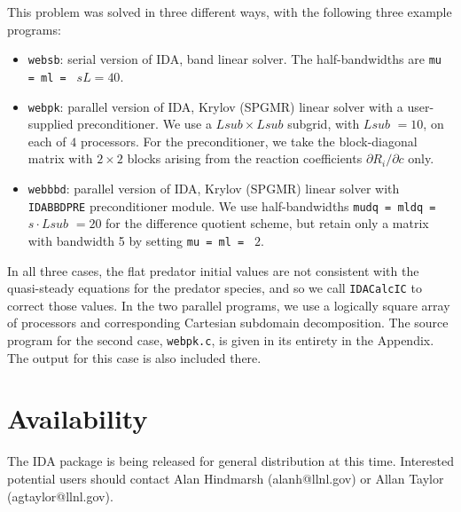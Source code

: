 This problem was solved in three different ways, with the following
three example programs:
\begin{itemize}

\item {\tt websb}: serial version of IDA, band linear solver.  The
half-bandwidths are 
\newline
{\tt mu = ml = } $sL = 40$.

\item {\tt webpk}: parallel version of IDA, Krylov (SPGMR) linear
solver with a user-supplied preconditioner. We use a $\mathit{Lsub} \times 
\mathit{Lsub}$ subgrid, with $\mathit{Lsub}$ $ = 10$, on each of $4$ processors. 
For the preconditioner, we take the block-diagonal matrix with $2 \times 2$ 
blocks arising from the reaction coefficients $\partial R_i/\partial c$ only.

\item {\tt webbbd}: parallel version of IDA, Krylov (SPGMR) linear
solver with {\tt IDABBDPRE} preconditioner module.  We use 
half-bandwidths {\tt mudq = mldq =} $\mathit{s}\cdot \mathit{Lsub}$ $ = 20$ 
for the difference quotient scheme, but retain only a matrix with 
bandwidth 5 by setting {\tt mu = ml = } $2$.

\end{itemize}
In all three cases, the flat predator initial values are not consistent 
with the quasi-steady equations for the predator species, and so we call 
{\tt IDACalcIC} to correct those values.  In the two parallel
programs, we use a logically square array of processors and
corresponding Cartesian subdomain decomposition.
The source program for the second case, {\tt webpk.c}, is given in its
entirety in the Appendix. The output for this case is also included
there.


\section{Availability}

The IDA package is being released for general distribution at this
time.  Interested potential users should contact Alan Hindmarsh
(alanh@llnl.gov) or Allan Taylor (agtaylor@llnl.gov).


